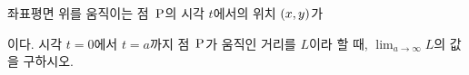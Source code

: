 \hspace*{2mm}\begin{minipage}[t]{\dimexpr\linewidth-2mm\relax}\vspace{0pt}
좌표평면 위를 움직이는 점~$\mathrm{P}$의 시각 $t$에서의 위치 $(x{,}\mkern3mu\mathopen{}y)$가 \par\smallskip{}\par\smallskip\noindent 이다. 시각 $t=0$에서 $t=a$까지 점~$\mathrm{P}$가 움직인 거리를 $L$이라 할 때, $\displaystyle\lim_{a\to\infty}L$의 값을 구하시오.\end{minipage}
